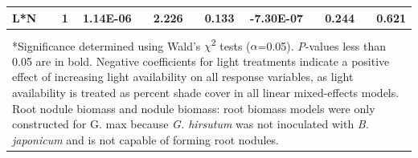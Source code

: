 \begin{table}[]
{\begin{tabular}{p{2.5cm}p{0.5cm}p{2cm}p{1.5cm}p{1.5cm}p{2cm}p{1.5cm}p{1.5cm}}
             L*N                        
             & \multicolumn{1}{r}{1}
             &  \multicolumn{1}{r}{1.14E-06}
             &   \multicolumn{1}{r}{2.226}
             & \multicolumn{1}{r}{0.133}
             & \multicolumn{1}{r}{-7.30E-07}
             &   \multicolumn{1}{r}{0.244}
             & \multicolumn{1}{r}{0.621}
             \\
             \hline
             \\
             \multicolumn{8}{p{16cm}}{*Significance determined using Wald’s $\chi$\textsuperscript{2} tests ($\alpha$=0.05). \textit{P}-values less than 0.05 are in bold. Negative coefficients for light treatments indicate a positive effect of increasing light availability on all response variables, as light availability is treated as percent shade cover in all linear mixed-effects models. Root nodule biomass and nodule biomass: root biomass models were only constructed for G. max because \textit{G. hirsutum} was not inoculated with \textit{B. japonicum} and is not capable of forming root nodules.}
\end{tabular}
}
\end{table}
\clearpage

